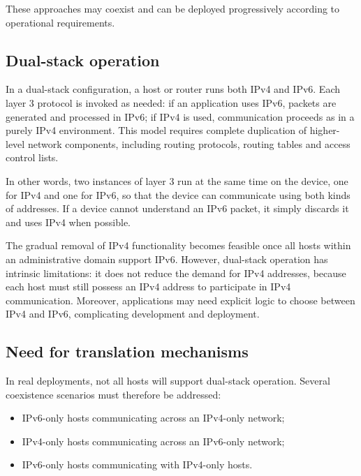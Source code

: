 These approaches may coexist and can be deployed progressively according to operational requirements.

\subsection{Dual-stack operation}

In a dual-stack configuration, a host or router runs both IPv4 and IPv6. Each layer 3 protocol is invoked as needed: if an application uses IPv6, packets are generated and processed in IPv6; if IPv4 is used, communication proceeds as in a purely IPv4 environment. This model requires complete duplication of higher-level network components, including routing protocols, routing tables and access control lists.

In other words, two instances of layer 3 run at the same time on the device, one
for IPv4 and one for IPv6, so that the device can communicate using both kinds of
addresses. If a device cannot understand an IPv6 packet, it simply discards it
and uses IPv4 when possible.

The gradual removal of IPv4 functionality becomes feasible once all hosts within an administrative domain support IPv6. However, dual-stack operation has intrinsic limitations: it does not reduce the demand for IPv4 addresses, because each host must still possess an IPv4 address to participate in IPv4 communication. Moreover, applications may need explicit logic to choose between IPv4 and IPv6, complicating development and deployment.

\begin{center}
\end{center}

\begin{center}
\end{center}

\subsection{Need for translation mechanisms}

In real deployments, not all hosts will support dual-stack operation. Several coexistence scenarios must therefore be addressed:

\begin{itemize}
\item IPv6-only hosts communicating across an IPv4-only network;
\item IPv4-only hosts communicating across an IPv6-only network;
\item IPv6-only hosts communicating with IPv4-only hosts.
\end{itemize}

